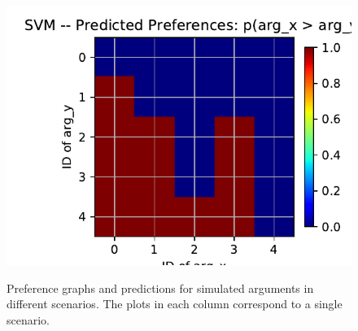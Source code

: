 \begin{figure}
{%
  \includegraphics[width=0.56\columnwidth, clip=True, trim=58 5 10 24]{figures/cycles_demo/undecided/SVM_probas} 
}
\caption{Preference graphs and predictions for simulated arguments in different scenarios. The plots in each column correspond to a single scenario.}
\end{figure}

